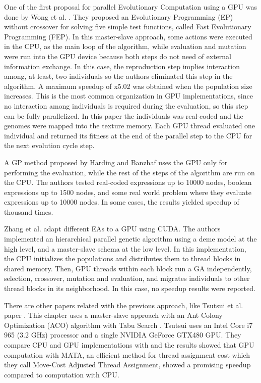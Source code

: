 \documentclass[prodmode,acmtecs]{acmsmall}
\begin{document}
One of the first proposal for parallel Evolutionary Computation using a GPU was done by Wong et al. \cite{man-leung-wong-parallel-2005}. They  proposed an Evolutionary Programming (EP) without crossover for solving five simple test functions, called Fast Evolutionary Programming (FEP). In this master-slave approach, some actions were executed in the CPU, as the main loop of the algorithm, while evaluation and mutation were run into the GPU device because both steps do not need of external information exchange. In this case, the reproduction step implies interaction among, at least, two individuals so the authors eliminated this step in the algorithm. A maximum speedup of x5.02 was obtained when the population size increases. This is the most common organization in GPU implementations, since no interaction among individuals is required during the evaluation, so this step can be fully parallelized. In this paper the individuals was real-coded and the genomes were mapped into the texture memory. Each GPU thread evaluated one individual and returned its fitness at the end of the parallel step to the CPU for the next evolution cycle step.

A GP method proposed by Harding and Banzhaf \cite{4215552} uses the GPU only for performing the evaluation, while the rest of the steps of the algorithm are run on the CPU. The authors tested real-coded expressions up to 10000 nodes, boolean expressions up to 1500 nodes, and some real world problem where they evaluate expressions up to 10000 nodes. In some cases, the results yielded speedup of thousand times.

Zhang et al. \cite{ZhangImplementationMasterSlave} adapt different EAs to a GPU using CUDA. The authors implemented an hierarchical parallel genetic algorithm using a deme model at the high level, and a master-slave schema at the low level. In this implementation, the CPU initializes the populations and distributes them to thread blocks in shared memory. Then, GPU threads within each block run a GA independently, selection, crossover, mutation and evaluation, and migrates individuals to other thread blocks in its neighborhood. In this case, no speedup results were reported.

There are other papers related with the previous approach, like Tsutsui et al. paper \cite{Tsutsui:2011:GECCO}. This chapter uses a master-slave approach with an Ant Colony Optimization (ACO) algorithm \cite{Dorigo:1999:ACO:329055_329062} with Tabu Search \cite{Glover:1997:TS:549765}. Tsutsui uses an Intel Core i7 965 (3.2 GHz) processor and a single NVIDIA GeForce GTX480 GPU. They compare CPU and GPU implementations with and the results showed that GPU computation with MATA, an efficient method for thread assignment cost which they call Move-Cost Adjusted Thread Assignment, showed a promising speedup compared to computation with CPU.
\end{document}
